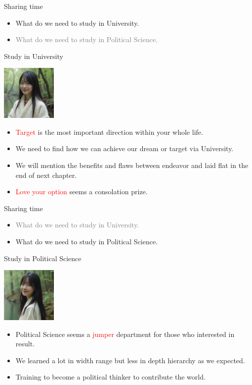 \documentclass{beamer}
\begin{document}
\begin{frame}{Sharing time}
\begin{itemize}
\item What do we need to study in University.
\item \textcolor{gray}{What do we need to study in Political Science.}
\end{itemize}
\end{frame}
\begin{frame}{Study in University}
\begin{center}
\includegraphics[width=0.2\textwidth]{target.png}
\end{center}
\begin{itemize}
\item \textcolor{red}{Target} is the most important direction within your whole life.
\item We need to find how we can achieve our dream or target via University.
\item We will mention the benefits and flaws between endeavor and laid flat in the end of next chapter.
\item \textcolor{red}{Love your option} seems a consolation prize.
\end{itemize}
\end{frame}
\begin{frame}{Sharing time}
\begin{itemize}
\item \textcolor{gray}{What do we need to study in University.}
\item What do we need to study in Political Science.
\end{itemize}
\end{frame}
\begin{frame}{Study in Political Science}
\begin{center}
\includegraphics[width=0.2\textwidth]{motivate.png}
\end{center}
\begin{itemize}
\item Political Science seems a \textcolor{red}{jumper} department for those who interested in result.
\item We learned a lot in width range but less in depth hierarchy as we expected.
\item Training to become a political thinker to contribute the world.
\end{itemize}
\end{frame}
\end{document}
